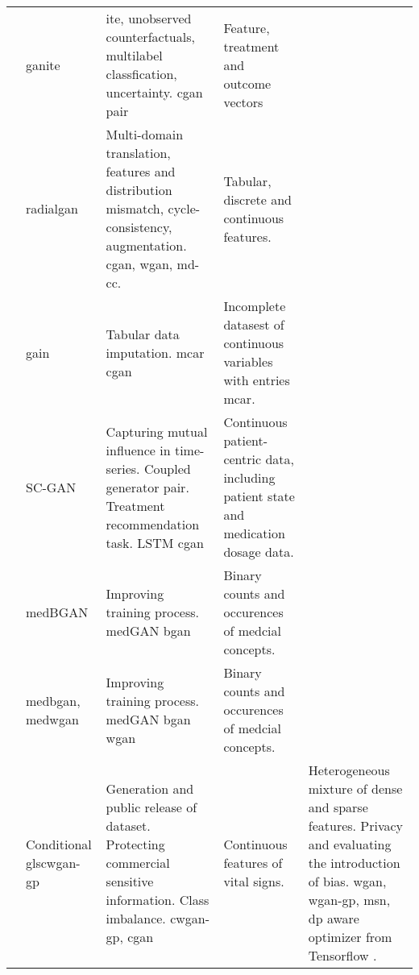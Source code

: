 \begin{sidewaystable}[htbp]
\begin{tabularx}{\textwidth}{@{}p{4cm}XXX@{}}
            \cite{Yoon2018-ite} 
            & \gls{ganite} 
            & \gls{ite}, unobserved counterfactuals, multilabel classfication, uncertainty. \gls{cgan} pair
            & Feature, treatment and outcome vectors\\
            
            \cite{Yoon2018-radial}
            & \gls{radialgan} 
            & Multi-domain translation, features and distribution mismatch, cycle-consistency, augmentation. \gls{cgan}, \gls{wgan}, \gls{md-cc}.
            & Tabular, discrete and continuous features.\\
            
            \cite{yoon2018imputation}
            & \gls{gain}
            & Tabular data imputation. \gls{mcar} \gls{cgan}
            & Incomplete datasest of continuous variables with entries \gls{mcar}.\\
            
            \cite{Wang_2019}
            & \gls{SC-GAN}
            & Capturing mutual influence in time-series. Coupled generator pair. Treatment recommendation task.  \gls{LSTM} \gls{cgan}
            & Continuous patient-centric data, including patient state and medication dosage data.\\
            
            \cite{baowaly_2019_IEEE}
            & \gls{medBGAN}
            & Improving training process. \gls{medGAN} \gls{bgan}
            & Binary counts and occurences of medcial concepts.\\
            
            \cite{baowaly_2019_jamia}
            & \gls{medbgan}, \gls{medwgan}
            & Improving training process. \gls{medGAN} \gls{bgan} \gls{wgan}
            & Binary counts and occurences of medcial concepts.\\
            
            \cite{severo2019ward2icu}
            & Conditional gls{cwgan-gp} 
            & Generation and public release of dataset. Protecting commercial sensitive information. Class imbalance. \gls{cwgan-gp}, \gls{cgan}
            & Continuous features of vital signs.
            
            \cite{chin2019generation}
            & Heterogeneous mixture of dense and sparse features. Privacy and evaluating the introduction of bias. \gls{wgan}, \gls{wgan-gp}, 					\gls{msn}, \gls{dp} aware optimizer from Tensorflow \cite{tensorflow-privacy}.
            

\end{tabularx}
\end{sidewaystable}

